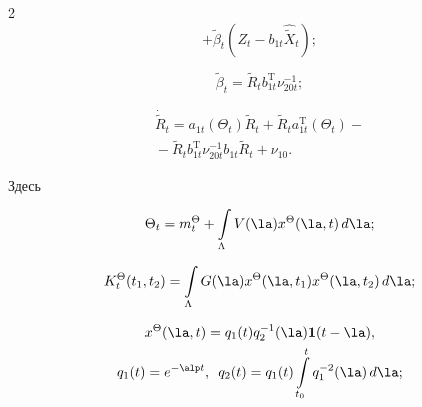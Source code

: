 \begin{multicols}{2}
\begin{equation}
+\tilde \beta_t (Z_t - b_{1t} {\hat{\tilde X}}_t);

\label{e6.8-s2}

\end{equation}

  \begin{equation}

  \tilde \beta_t =\tilde R_t b_{1t}^{\mathrm{T}} \nu_{20t}^{-1};

  \label{e6.9-s2}

  \end{equation}

  

\vspace*{-12pt}

  

\noindent

\begin{multline}

{\dot{\tilde R}}_t = a_{1t}(\Theta_t) \tilde R_t + \tilde R_t 

a_{1t}^{\mathrm{T}}(\Theta_t)-{}\\

{}-\tilde R_t b_{1t}^{\mathrm{T}} \nu_{20t}^{-1} b_{1t} \tilde R_t +\nu_{10}.

\label{e6.10-s2}

\end{multline}

Здесь

    $$

    \Theta_t = m_t^\Theta + \int\limits_\Lambda V(\la) x^\Theta (\la,t) \,d\la;

    $$

    $$

    K_t^\Theta (t_1, t_2) =\int\limits_\Lambda G(\la) x^\Theta (\la,t_1) x^\Theta 

(\la,t_2) \,d\la;

$$

    

\vspace*{-12pt}

    

    \noindent

    \begin{multline*}

    x^\Theta(\la,t) = q_1 (t) q_2^{-1} (\la) {\bf 1} (t-\la),\\

     q_1 (t) = 

e^{-\alp t},\enskip q_2(t) = q_1 (t) \int\limits_{t_0}^t q_1^{-2} (\la)\, d\la;


\end{multline*}
\end{multicols}
